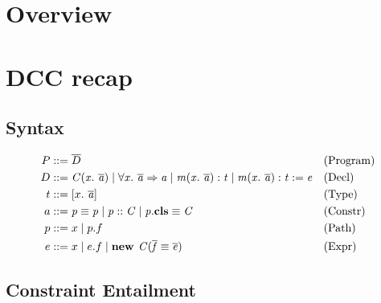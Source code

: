 \documentclass[a4paper]{article}
\begin{document}
\section{Overview}
\section{DCC recap}
\subsection{Syntax}
\label{sec:syntax}
  \begin{align*}
    P &::= \overline{D} && \text{(Program)}\\
    D &::= \mathit{C}(\mathit{x}.\ \mathit{\overline{a}})
      \mid  \forall \mathit{x}.\ \mathit{\overline{a}} \Rightarrow \mathit{a}
      \mid \mathit{m}(\mathit{x}.\ \mathit{\overline{a}}): \mathit{t}
      \mid \mathit{m}(\mathit{x}.\ \mathit{\overline{a}}): \mathit{t} := \mathit{e} && \text{(Decl)}\\
    t &::= [x.\ \mathit{\overline{a}}] && \text{(Type)}\\
    a &::= \mathit{p} \equiv \mathit{p}
      \mid \mathit{p} :: \mathit{C}
      \mid \mathit{p}.\textbf{cls} \equiv \mathit{C} && \text{(Constr)}\\
    p &::= x \mid p.f && \text{(Path)}\\
    e &::= x
      \mid e.f
      \mid \textbf{new } \mathit{C}(\mathit{\mathit{\overline{f}} \equiv \mathit{\overline{e}}}) && \text{(Expr)}
  \end{align*}

\subsection{Constraint Entailment}
\label{sec:constraint-entailment}
\end{document}
